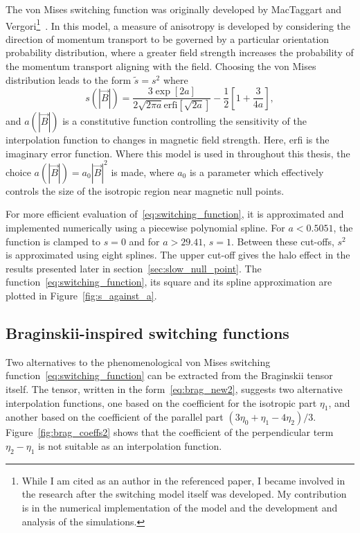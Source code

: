 The von Mises switching function was originally developed by MacTaggart and Vergori\footnote{While I am cited as an author in the referenced paper, I became involved in the research after the switching model itself was developed. My contribution is in the numerical implementation of the model and the development and analysis of the simulations.}~\cite{mactaggartBraginskiiMagnetohydrodynamicsArbitrary2017}. In this model, a measure of anisotropy is developed by considering the direction of momentum transport to be governed by a particular orientation probability distribution, where a greater field strength increases the probability of the momentum transport aligning with the field. Choosing the von Mises distribution leads to the form $\tilde{s} = s^2$ where
\begin{equation}
  \label{eq:switching_function}
s(|\vec{B}|) = \frac{3 \exp[2a]}{2\sqrt{2\pi a} \text{erfi}[\sqrt{2a}]} - \frac{1}{2}\left[ 1 + \frac{3}{4a} \right],
\end{equation}
and $a(|\vec{B}|)$ is a constitutive function controlling the sensitivity of the interpolation function to changes in magnetic field strength. Here, erfi is the imaginary error function. Where this model is used in throughout this thesis, the choice $a(|\vec{B}|) = a_0 |\vec{B}|^2$ is made, where $a_0$ is a parameter which effectively controls the size of the isotropic region near magnetic null points. 

For more efficient evaluation of~\eqref{eq:switching_function}, it is approximated and implemented numerically using a piecewise polynomial spline. For $a < 0.5051$, the function is clamped to $s=0$ and for $a > 29.41$, $s=1$. Between these cut-offs, $s^2$ is approximated using eight splines. The upper cut-off gives the halo effect in the results presented later in section~\ref{sec:slow_null_point}. The function~\eqref{eq:switching_function}, its square and its spline approximation are plotted in Figure~\ref{fig:s_against_a}. 

\subsection{Braginskii-inspired switching functions}

Two alternatives to the phenomenological von Mises switching function~\eqref{eq:switching_function} can be extracted from the Braginskii tensor itself. The tensor, written in the form~\eqref{eq:brag_new2}, suggests two alternative interpolation functions, one based on the coefficient for the isotropic part $\eta_1$, and another based on the coefficient of the parallel part $(3\eta_0+\eta_1-4\eta_2)/3$. Figure~\ref{fig:brag_coeffs2} shows that the coefficient of the perpendicular term $\eta_2 - \eta_1$ is not suitable as an interpolation function.

